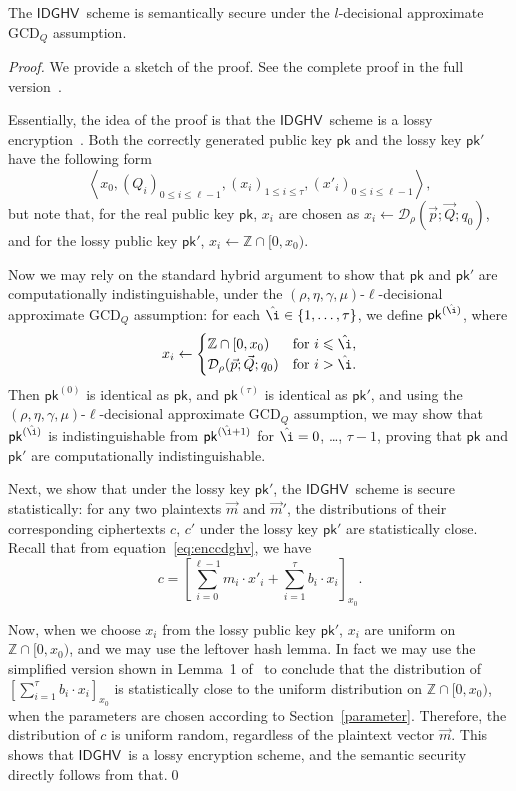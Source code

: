 \documentclass[11pt]{llncs}
\renewcommand\leq\leqslant
\newcommand{\Z}{{\mathbb Z}}
\newcommand*{\pk}{\ensuremath{\mathsf{pk}}}
\newcommand*{\CDGHV}{\ensuremath{\mathsf{IDGHV}}}
\newcommand*\D{\ensuremath{\mathcal D}}
\begin{document}
\begin{theorem}
The \CDGHV\ scheme is semantically secure under the $l$-decisional approximate $\mathrm{GCD}_Q$ assumption.
\end{theorem}
\begin{proof}
We provide a sketch of the proof.  See the complete proof in the full version~\cite{KLYC2013}.

Essentially, the idea of the proof is that the \CDGHV\ scheme is a lossy encryption~\cite{BHY2009}.  Both the correctly generated public key $\pk$ and the lossy key $\pk'$ have the following form
\[
\left\langle x_0, \left(Q_i\right)_{0\leq i \leq \ell-1},\left(x_i\right)_{1\leq i\leq \tau}, \left(x'_i\right)_{0\leq i\leq \ell-1}\right\rangle,
\]
but note that, for the real public key $\pk$, $x_i$ are chosen as $x_i\gets\D_\rho(\vec{p}; \vec{Q}; q_0)$,
and for the lossy public key $\pk'$, $x_i\gets\Z\cap[0,x_0)$.

Now we may rely on the standard hybrid argument to show that $\pk$ and $\pk'$ are computationally indistinguishable, under the $(\rho,\eta,\gamma,\mu)$-$\ell$-decisional approximate GCD$_Q$ assumption: for each $\hat\i\in\{1, \dots, \tau\}$, we define $\pk^{(\hat\i)}$, where
\[
x_i \gets \begin{cases}
\Z\cap[0,x_0)&\text{for $i\leq \hat\i$},\\
\D_\rho(\vec{p}; \vec{Q}; q_0)&\text{for $i>\hat\i$}.
\end{cases}
\]
Then $\pk^{(0)}$ is identical as $\pk$, and $\pk^{(\tau)}$ is identical as $\pk'$, and using the $(\rho,\eta,\gamma,\mu)$-$\ell$-decisional approximate GCD$_Q$ assumption, we may show that $\pk^{(\hat\i)}$ is indistinguishable from $\pk^{(\hat\i+1)}$ for $\hat\i=0$, \dots, $\tau-1$,
proving that $\pk$ and $\pk'$ are computationally indistinguishable.

Next, we show that under the lossy key $\pk'$, the \CDGHV\ scheme is secure statistically: for any two plaintexts $\vec{m}$ and $\vec{m}'$, the distributions of their corresponding ciphertexts $c$, $c'$ under the lossy key $\pk'$ are statistically close.  Recall that from equation~\ref{eq:enccdghv}, we have
\begin{equation*}
c = \left[\sum\limits_{i=0}^{\ell-1} m_i \cdot x'_i + 
	\sum_{i=1}^\tau 
b_i\cdot x_i\right]_{x_0}.
\end{equation*}

Now, when we choose $x_i$ from the lossy public key $\pk'$, $x_i$ are uniform on $\Z\cap[0,x_0)$, and we may use the leftover hash lemma.  In fact we may use the simplified version shown in Lemma~1 of~\cite{vDGHV2010} to conclude that the distribution of $[\sum_{i=1}^\tau b_i\cdot x_i]_{x_0}$ is statistically close to the uniform distribution on $\Z\cap[0,x_0)$, when the parameters are chosen according to Section~\ref{parameter}.  Therefore, the distribution of $c$ is uniform random, regardless of the plaintext vector $\vec{m}$.  This shows that \CDGHV\ is a lossy encryption scheme, and the semantic security directly follows from that.\qed
\end{proof}
\end{document}
